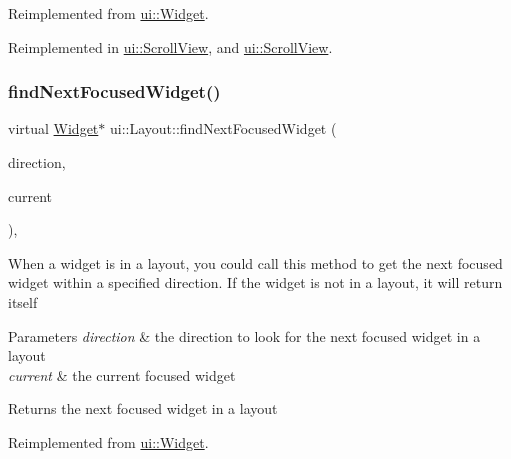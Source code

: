 Reimplemented from \hyperlink{classui_1_1Widget_a40a7ca0d546f39536dadf60722b947d0}{ui\+::\+Widget}.



Reimplemented in \hyperlink{classui_1_1ScrollView_adda46d15b5742af6e64a96b23c3ca10a}{ui\+::\+Scroll\+View}, and \hyperlink{classui_1_1ScrollView_adda46d15b5742af6e64a96b23c3ca10a}{ui\+::\+Scroll\+View}.

\mbox{\label{classui_1_1Layout_ae19c0e9a2c478634667f1241db1df0c4}} 
\subsubsection{\texorpdfstring{find\+Next\+Focused\+Widget()}{findNextFocusedWidget()}\hspace{0.1cm}{\footnotesize\ttfamily [2/2]}}
{\footnotesize\ttfamily virtual \hyperlink{classui_1_1Widget}{Widget}$\ast$ ui\+::\+Layout\+::find\+Next\+Focused\+Widget (\begin{DoxyParamCaption}\item[{\hyperlink{classui_1_1Widget_a8ae8e8fc793a04a87584205cd1e8a8a5}{Focus\+Direction}}]{direction,  }\item[{\hyperlink{classui_1_1Widget}{Widget} $\ast$}]{current }\end{DoxyParamCaption})\hspace{0.3cm}{\ttfamily [override]}, {\ttfamily [virtual]}}

When a widget is in a layout, you could call this method to get the next focused widget within a specified direction. If the widget is not in a layout, it will return itself 
\begin{DoxyParams}{Parameters}
{\em direction} & the direction to look for the next focused widget in a layout \\
\hline
{\em current} & the current focused widget \\
\hline
\end{DoxyParams}
\begin{DoxyReturn}{Returns}
the next focused widget in a layout 
\end{DoxyReturn}


Reimplemented from \hyperlink{classui_1_1Widget_a40a7ca0d546f39536dadf60722b947d0}{ui\+::\+Widget}.



